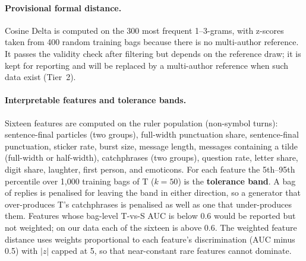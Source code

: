 \paragraph{Provisional formal distance.}
Cosine Delta \citep{smith2011improving,evert2017understanding} is computed on the 300 most frequent 1--3-grams, with z-scores taken from 400 random training bags because there is no multi-author reference.
It passes the validity check after filtering but depends on the reference draw; it is kept for reporting and will be replaced by a multi-author reference when such data exist (Tier~2).

\paragraph{Interpretable features and tolerance bands.}
Sixteen features are computed on the ruler population (non-symbol turns): sentence-final particles (two groups), full-width punctuation share, sentence-final punctuation, sticker rate, burst size, message length, messages containing a tilde (full-width or half-width), catchphrases (two groups), question rate, letter share, digit share, laughter, first person, and emoticons.
For each feature the 5th--95th percentile over 1,000 training bags of T ($k = 50$) is the \textbf{tolerance band}.
A bag of replies is penalised for leaving the band in either direction, so a generator that over-produces T's catchphrases is penalised as well as one that under-produces them.
Features whose bag-level T-vs-S AUC is below 0.6 would be reported but not weighted; on our data each of the sixteen is above 0.6.
The weighted feature distance uses weights proportional to each feature's discrimination (AUC minus 0.5) with $|z|$ capped at 5, so that near-constant rare features cannot dominate.

